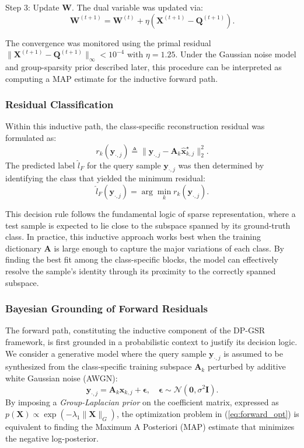 \documentclass[10pt,comsoc]{IEEEtran}
\begin{document}
Step 3: Update $\mathbf{W}$. The dual variable was updated via:
\begin{equation}
\mathbf{W}^{(t+1)} = \mathbf{W}^{(t)} + \eta (\mathbf{X}^{(t+1)} - \mathbf{Q}^{(t+1)}).
\end{equation}

The convergence was monitored using the primal residual $\|\mathbf{X}^{(t+1)} - \mathbf{Q}^{(t+1)}\|_\infty < 10^{-4}$ with $\eta = 1.25$. Under the Gaussian noise model and group-sparsity prior described later, this procedure can be interpreted as computing a MAP estimate for the inductive forward path.

\subsubsection{Residual Classification}
Within this inductive path, the class-specific reconstruction residual was formulated as:
\begin{equation}
\label{eq:forward_residual}
r_k(\mathbf{y}_{\cdot,j}) \triangleq \|\mathbf{y}_{\cdot,j} - \mathbf{A}_k \hat{\mathbf{x}}_{k,j}^\star\|_2^2.
\end{equation}
The predicted label $\hat{l}_F$ for the query sample $\mathbf{y}_{\cdot,j}$ was then determined by identifying the class that yielded the minimum residual:
\begin{equation}
\label{eq:forward_decision}
\hat{l}_F(\mathbf{y}_{\cdot,j}) = \arg\min_{k} r_k(\mathbf{y}_{\cdot,j}).
\end{equation}

This decision rule follows the fundamental logic of sparse representation, where a test sample is expected to lie close to the subspace spanned by its ground-truth class. In practice, this inductive approach works best when the training dictionary $\mathbf{A}$ is large enough to capture the major variations of each class. By finding the best fit among the class-specific blocks, the model can effectively resolve the sample's identity through its proximity to the correctly spanned subspace.

\subsubsection{Bayesian Grounding of Forward Residuals}
The forward path, constituting the inductive component of the DP-GSR framework, is first grounded in a probabilistic context to justify its decision logic. We consider a generative model where the query sample $\mathbf{y}_{\cdot,j}$ is assumed to be synthesized from the class-specific training subspace $\mathbf{A}_k$ perturbed by additive white Gaussian noise (AWGN):
\begin{equation}
\mathbf{y}_{\cdot,j} = \mathbf{A}_k \mathbf{x}_{k,j} + \mathbf{\epsilon}, \quad \mathbf{\epsilon} \sim \mathcal{N}(\mathbf{0}, \sigma^2 \mathbf{I}).
\end{equation}
By imposing a \textit{Group-Laplacian prior} on the coefficient matrix, expressed as $p(\mathbf{X}) \propto \exp(-\lambda_1 \|\mathbf{X}\|_G)$, the optimization problem in (\ref{eq:forward_opt}) is equivalent to finding the Maximum A Posteriori (MAP) estimate that minimizes the negative log-posterior.
\end{document}
